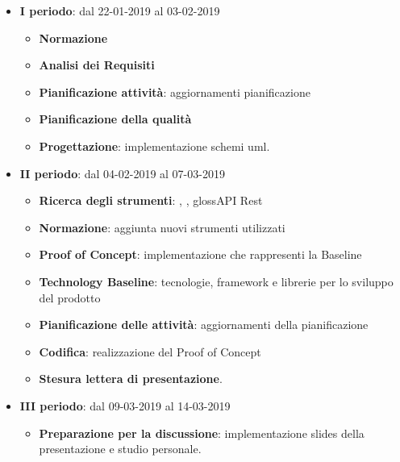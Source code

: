 		\begin{itemize}
			\item \textbf{I periodo}: dal 22-01-2019 al 03-02-2019
			\begin{itemize}
    	        \item \textbf{Normazione}
    	        \item \textbf{Analisi dei Requisiti}
    	        \item \textbf{Pianificazione attività}: aggiornamenti pianificazione
    	        \item \textbf{Pianificazione della qualità}
    	        \item \textbf{Progettazione}: implementazione schemi uml.
        	\end{itemize}
			\item \textbf{II periodo}: dal 04-02-2019 al 07-03-2019
			\begin{itemize}
				\item \textbf{Ricerca degli strumenti}: , , gloss{API Rest} 
    	        \item \textbf{Normazione}: aggiunta nuovi strumenti utilizzati
    	        \item \textbf{Proof of Concept}: implementazione che rappresenti la Baseline
    	        \item \textbf{Technology Baseline}: tecnologie, framework e librerie per lo sviluppo del prodotto
    	        \item \textbf{Pianificazione delle attività}: aggiornamenti della pianificazione
    	        \item \textbf{Codifica}: realizzazione del Proof of Concept
    	        \item \textbf{Stesura lettera di presentazione}.
        	\end{itemize}
        	\item \textbf{III periodo}: dal 09-03-2019 al 14-03-2019
			\begin{itemize}
				\item \textbf{Preparazione per la discussione}: implementazione slides della presentazione e studio personale.
        	\end{itemize}
		\end{itemize}
        

